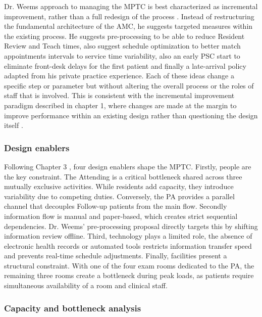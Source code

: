 Dr. Weems approach to managing the MPTC is best characterized as incremental improvement, rather than a full redesign of the process \parencite{pensumbok}. Instead of restructuring the fundamental architecture of the AMC, he suggests targeted measures within the existing process. He suggests pre-processing to be able to reduce Resident Review and Teach times, also suggest schedule optimization to better match appointments intervals to service time variability, also an early PSC start to eliminate front-desk delays for the first patient and finally a late-arrival policy adapted from his private practice experience. Each of these ideas change a specific step or parameter but without altering the overall process or the roles of staff that is involved. This is consistent with the incremental improvement paradigm described in chapter 1, where changes are made at the margin to improve performance within an existing design rather than questioning the design itself \parencite{pensumbok}. 

\subsubsection{Design enablers}

Following Chapter 3 \parencite[sec. 3.4]{pensumbok}, four design enablers shape the MPTC. Firstly, people are the key constraint. The Attending is a critical bottleneck shared across three mutually exclusive activities. While residents add capacity, they introduce variability due to competing duties. Conversely, the PA provides a parallel channel that decouples Follow-up patients from the main flow. Secondly information flow is manual and paper-based, which creates strict sequential dependencies. Dr. Weems' pre-processing proposal directly targets this by shifting information review offline. Third, technology plays a limited role, the absence of electronic health records or automated tools restricts information transfer speed and prevents real-time schedule adjustments. Finally, facilities present a structural constraint. With one of the four exam rooms dedicated to the PA, the remaining three rooms create a bottleneck during peak loads, as patients require simultaneous availability of a room and clinical staff. 

\subsubsection{Capacity and bottleneck analysis}

